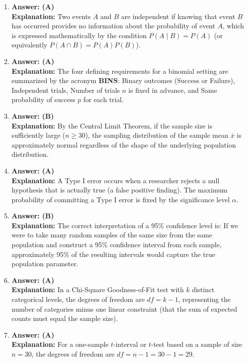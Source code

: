 \begin{enumerate}[leftmargin=1.5em]
  \item \textbf{Answer: (A)} \\
  \textbf{Explanation:} Two events $A$ and $B$ are independent if knowing that event $B$ has occurred provides no information about the probability of event $A$, which is expressed mathematically by the condition $P(A \mid B) = P(A)$ (or equivalently $P(A \cap B) = P(A)P(B)$).

  \item \textbf{Answer: (A)} \\
  \textbf{Explanation:} The four defining requirements for a binomial setting are summarized by the acronym \textbf{BINS}: Binary outcomes (Success or Failure), Independent trials, Number of trials $n$ is fixed in advance, and Same probability of success $p$ for each trial.

  \item \textbf{Answer: (B)} \\
  \textbf{Explanation:} By the Central Limit Theorem, if the sample size is sufficiently large ($n \ge 30$), the sampling distribution of the sample mean $\bar{x}$ is approximately normal regardless of the shape of the underlying population distribution.

  \item \textbf{Answer: (A)} \\
  \textbf{Explanation:} A Type I error occurs when a researcher rejects a null hypothesis that is actually true (a false positive finding). The maximum probability of committing a Type I error is fixed by the significance level $\alpha$.

  \item \textbf{Answer: (B)} \\
  \textbf{Explanation:} The correct interpretation of a 95\% confidence level is: If we were to take many random samples of the same size from the same population and construct a 95\% confidence interval from each sample, approximately 95\% of the resulting intervals would capture the true population parameter.

  \item \textbf{Answer: (A)} \\
  \textbf{Explanation:} In a Chi-Square Goodness-of-Fit test with $k$ distinct categorical levels, the degrees of freedom are $df = k - 1$, representing the number of categories minus one linear constraint (that the sum of expected counts must equal the sample size).

  \item \textbf{Answer: (A)} \\
  \textbf{Explanation:} For a one-sample $t$-interval or $t$-test based on a sample of size $n = 30$, the degrees of freedom are $df = n - 1 = 30 - 1 = 29$.


\end{enumerate}
